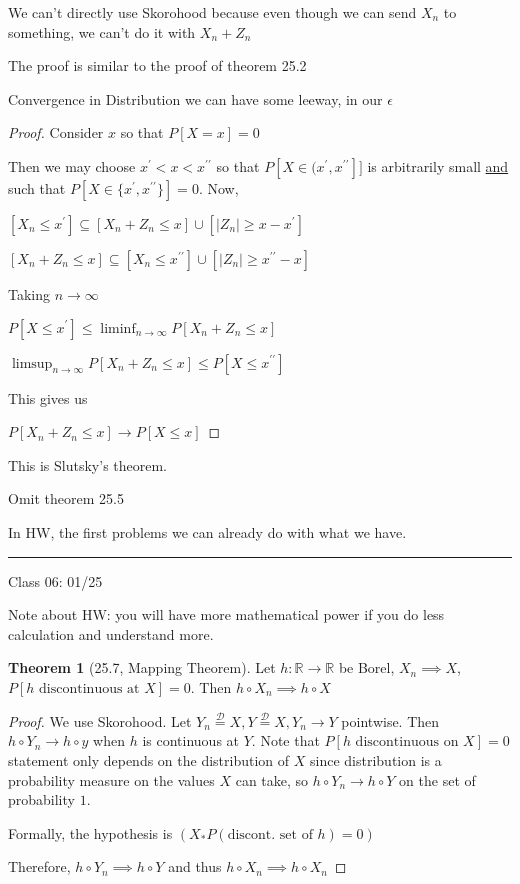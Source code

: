 \documentclass{article}
\theoremstyle{definition}
\newtheorem{theorem}{Theorem}
\begin{document}
We can't directly use Skorohood because even though we can send \(X_n\) to something, we can't do it with \(X_n + Z_n\) 

The proof is similar to the proof of theorem 25.2

Convergence in Distribution we can have some leeway, in our \(\epsilon\) 

\begin{proof}

    Consider \(x\) so that \(P[X=x]=0\) 

    Then we may choose \(x^{\prime} < x < x^{\prime\prime} \) so that \(P[X \in (x^{\prime} ,x^{\prime\prime} ]]\) is arbitrarily small \underline{and} such that \(P[X\in \{ x^{\prime} ,x^{\prime\prime}  \} ] = 0\). Now,

    \([X_n \leq x^{\prime} ] \subseteq [X_n + Z_n \leq x] \cup [\vert Z_n \vert \geq x - x^{\prime}]\) 

    \([X_n + Z_n \leq x] \subseteq [X_n \leq x^{\prime\prime} ] \cup [\vert Z_n \vert \geq x^{\prime\prime} -x]\) 

    Taking \(n\to \infty\) 

    \(P[X \leq x^{\prime} ] \leq \liminf_{n \to \infty} P[X_n + Z_n \leq x]\)

    \(\limsup_{n \to \infty} P[X_n + Z_n \leq x] \leq P[X \leq x^{\prime\prime} ]\) 

    This gives us

    \(P[X_n + Z_n \leq x] \to P[X \leq x]\) 

\end{proof}

This is Slutsky's theorem.

Omit theorem 25.5

In HW, the first problems we can already do with what we have.

\hfil
\hrule

Class 06: 01/25

Note about HW: you will have more mathematical power if you do less calculation and understand more.

\begin{theorem}[25.7, Mapping Theorem]
    Let \(h:\mathbb{R} \to \mathbb{R} \) be Borel, \(X_n \implies X\), \(P[h \text{ discontinuous at }X ]=0\). Then \(h \circ X_n \implies h \circ X\) 
\end{theorem}

\begin{proof}
    We use Skorohood. Let \(Y_n \overset{\mathcal{D} }{=} X, Y \overset{\mathcal{D} }{=} X, Y_n \to  Y  \) pointwise. Then \(h\circ Y_n \to h\circ y\) when \(h\) is continuous at \(Y\). Note that \(P[h \text{ discontinuous on }X ]=0\) statement only depends on the distribution of \(X\) since distribution is a probability measure on the values \(X\) can take, so \(h\circ Y_n \to h\circ Y\) on the set of probability \(1\).  

    Formally, the hypothesis is \((X_\ast P(\text{discont. set of }h )=0)\) 

    Therefore, \(h\circ Y_n \implies h\circ Y\) and thus \(h\circ X_n \implies h\circ X_n\) 

\end{proof}
\end{document}
